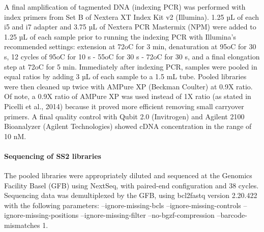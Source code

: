 A final amplification of tagmented DNA (indexing PCR) was performed with index primers from Set B of Nextera XT Index Kit v2 (Illumina). 1.25 µL of each i5 and i7 adapter and 3.75 µL of Nextera PCR Mastermix (NPM) were added to 1.25 µL of each sample prior to running the indexing PCR with Illumina’s recommended settings: extension at 72oC for 3 min, denaturation at 95oC for 30 s, 12 cycles of 95oC for 10 s - 55oC for 30 s - 72oC for 30 s, and a final elongation step at 72oC for 5 min.
Immediately after indexing PCR, samples were pooled in equal ratios by adding 3 µL of each sample to a 1.5 mL tube. Pooled libraries were then cleaned up twice with AMPure XP (Beckman Coulter) at 0.9X ratio. Of note, a 0.9X ratio of AMPure XP was used instead of 1X ratio (as stated in Picelli et al., 2014) because it proved more efficient removing small carryover primers. A final quality control with Qubit 2.0 (Invitrogen) and Agilent 2100 Bioanalyzer (Agilent Technologies) showed cDNA concentration in the range of 10 nM.

\paragraph{Sequencing of SS2 libraries}
The pooled libraries were appropriately diluted and sequenced at the Genomics Facility Basel (GFB) using NextSeq, with paired-end configuration and 38 cycles. Sequencing data was demultiplexed by the GFB, using bcl2fastq version 2.20.422 with the following parameters: --ignore-missing-bcls --ignore-missing-controls --ignore-missing-positions --ignore-missing-filter --no-bgzf-compression --barcode-mismatches 1.
 
